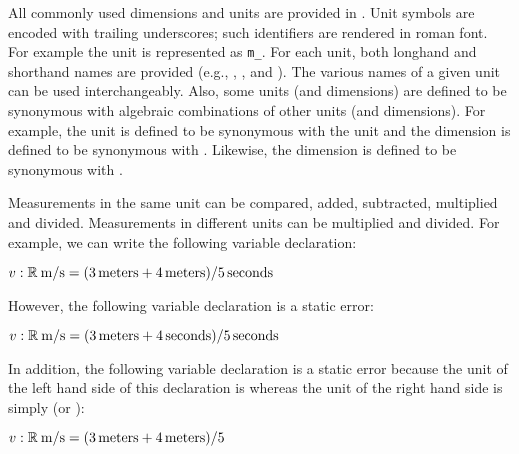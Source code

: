 All commonly used dimensions and units are provided in \library.
Unit symbols are encoded with trailing underscores;
such identifiers are rendered in roman font.
For example the unit  is represented as \verb$m_$.
For each unit, both longhand and shorthand names are provided
(e.g., ,
, and ).
The various names of a given unit can be used interchangeably.
Also, some units (and dimensions) are defined to be synonymous
with algebraic combinations of other units (and dimensions).
For example, the unit  is defined to be synonymous
with the unit 
and the dimension  is defined to be synonymous with
.
Likewise, the dimension 
is defined to be synonymous with .

Measurements in the same unit can be compared, added, subtracted,
multiplied and divided.
Measurements in different units can be multiplied and divided.
For example, we can write the following variable declaration:

\begin{Fortress}
\(v \mathrel{\mathtt{:}} \mathbb{R}\mskip 4mu plus 4mu\mathrm{m}/\mathrm{s} = (3\,\mathrm{meters} + 4\,\mathrm{meters}) / 5\,\mathrm{seconds}\)
\end{Fortress}

However, the following variable declaration is a static error:

\begin{Fortress}
\(v \mathrel{\mathtt{:}} \mathbb{R}\mskip 4mu plus 4mu\mathrm{m}/\mathrm{s} = (3\,\mathrm{meters} + 4\,\mathrm{seconds}) / 5\,\mathrm{seconds}\)
\end{Fortress}

In addition, the following variable declaration is a static error
because the unit of the left hand side of this declaration
is 
whereas the unit of the right hand side
is simply  (or ):

\begin{Fortress}
\(v \mathrel{\mathtt{:}} \mathbb{R}\mskip 4mu plus 4mu\mathrm{m}/\mathrm{s} = (3\,\mathrm{meters} + 4\,\mathrm{meters}) / 5\)
\end{Fortress}

